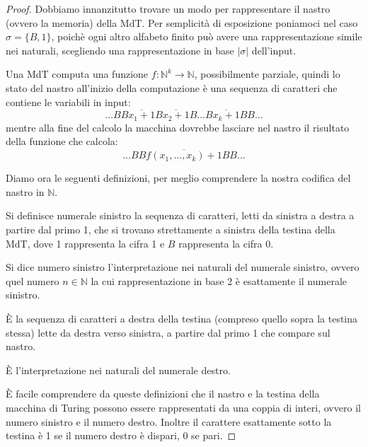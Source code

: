 \begin{proof}
Dobbiamo innanzitutto trovare un modo per rappresentare il nastro (ovvero la
memoria) della MdT. Per semplicità di esposizione poniamoci nel caso $\sigma =
\{ B, 1 \}$, poichè ogni altro alfabeto finito può avere una rappresentazione
simile nei naturali, scegliendo una rappresentazione in base $|\sigma|$
dell'input.

Una MdT computa una funzione $f: \mathbb{N}^k \rightarrow \mathbb{N}$,
possibilmente parziale, quindi lo stato del nastro all'inizio della
computazione è una sequenza di caratteri che contiene le variabili in
input:
$$\dots BB\overline{x_1+1}B\overline{x_2+1}B...B\overline{x_k+1}BB\dots $$
mentre alla fine del calcolo la macchina dovrebbe lasciare nel nastro
il risultato della funzione che calcola:
$$\dots BB\overline{f(x_1,\dots,x_k)+1}BB\dots $$

Diamo ora le seguenti definizioni, per meglio comprendere la nostra codifica
del nastro in $\mathbb{N}$.

\begin{definizione}
Si definisce numerale sinistro la sequenza di caratteri, letti da sinistra a
destra a partire dal primo 1, che si trovano strettamente a sinistra della
testina della MdT, dove 1 rappresenta la cifra 1 e $B$ rappresenta la cifra 0.
\end{definizione}
\begin{definizione}
Si dice numero sinistro l'interpretazione nei naturali del numerale sinistro,
ovvero quel numero $n \in \mathbb{N}$ la cui rappresentazione in base 2 è
esattamente il numerale sinistro.
\end{definizione}
\begin{definizione}
È la sequenza di caratteri a destra della testina (compreso quello sopra la
testina stessa) lette da destra verso sinistra, a partire dal primo 1 che
compare sul nastro.
\end{definizione}
\begin{definizione}
È l'interpretazione nei naturali del numerale destro.
\end{definizione}

È facile comprendere da queste definizioni che il nastro e la testina della
macchina di Turing possono essere rappresentati da una coppia di interi, ovvero
il numero sinistro e il numero destro. Inoltre il carattere esattamente sotto
la testina è 1 se il numero destro è dispari, 0 se pari.


\end{proof}
